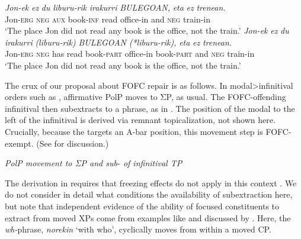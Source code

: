 \documentclass[output=paper]{langscibook}
\begin{document}
\ea
\ea \gll  \textit{Jon-ek} \textit{ez} \textit{du} \textit{liburu-rik} \textit{irakurri} \textit{BULEGOAN,} \textit{eta} \textit{ez} \textit{trenean.}\\
Jon-\textsc{erg} \textsc{neg} \textsc{aux} book-\textsc{inf} read office-in and \textsc{neg} train-in\\
\glt `The place Jon did not read any book is the office, not the train.'
\ex \gll  \textit{Jon-ek} \textit{ez} \textit{du} \textit{irakurri} \textit{(liburu-rik)} \textit{BULEGOAN} \textit{(*liburu-rik),} \textit{eta} \textit{ez} \textit{trenean.}\\
Jon-\textsc{erg} \textsc{neg} has read book-\textsc{part} office-in book-\textsc{part} and \textsc{neg} train-in\\
\glt `The place Jon did not read any book is the office, not the train.'	
\z\z 	
	
The crux of our proposal about FOFC repair is as follows.  In mo\-dal>in\-fin\-i\-ti\-val orders such as \protect{}, affirmative PolP moves to ΣP, as usual. The FOFC-offending infinitival  then subextracts to a  phrase, as in . The position of the modal to the left of the infinitival is derived via remnant topicalization, not shown here. Crucially, because the  targets an A-bar position, this movement step is FOFC-exempt. (See \cite{biberaueretal2014} for discussion.)

\ea \label{ex:haddican:46} \textit{PolP movement to ΣP and sub- of infinitival TP} \\
\z

The derivation in  requires that freezing effects do not apply in this context \citep{collins2005a, collins2005b}.  We do not consider in detail what conditions the availability of subextraction here, but note that independent evidence of the ability of focused constituents to extract from moved XPs come from examples like  and discussed by \cite{elordieta2008}.  Here, the \textit{wh-}phrase, \textit{norekin} `with who', cyclically moves from within a moved CP.
\end{document}
